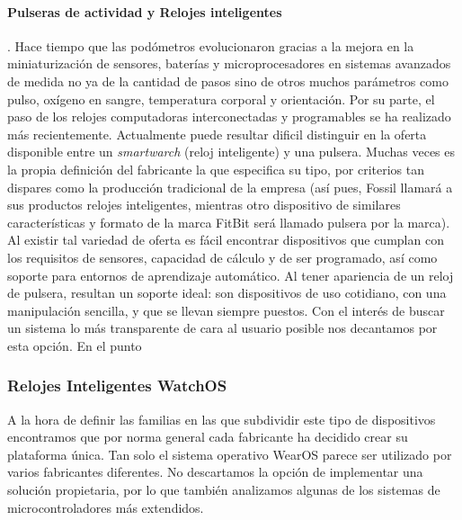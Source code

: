 \paragraph{Pulseras de actividad y Relojes inteligentes}. Hace tiempo que las podómetros evolucionaron gracias a la mejora en la miniaturización de sensores, baterías y microprocesadores en sistemas avanzados de medida no ya de la cantidad de pasos sino de otros muchos parámetros como pulso, oxígeno en sangre, temperatura corporal y orientación. Por su parte, el paso de los relojes computadoras interconectadas y programables se ha realizado más recientemente. Actualmente puede resultar dificil distinguir en la oferta disponible entre un \textit{smartwarch} (reloj inteligente) y una pulsera. Muchas veces es la propia definición del fabricante la que especifica su tipo, por criterios tan dispares como la producción tradicional de la empresa (así pues, Fossil llamará a sus productos relojes inteligentes, mientras otro dispositivo de similares características y formato de la marca FitBit será llamado pulsera por la marca). Al existir tal variedad de oferta es fácil encontrar dispositivos que cumplan con los requisitos de sensores, capacidad de cálculo y de ser programado, así como soporte para entornos de aprendizaje automático. Al tener apariencia de un reloj de pulsera, resultan un soporte ideal: son dispositivos de uso cotidiano, con una manipulación sencilla, y que se llevan siempre puestos. Con el interés de buscar un sistema lo más transparente de cara al usuario posible nos decantamos por esta opción. En el punto 

\subsubsection{Relojes Inteligentes WatchOS}

A la hora de definir las familias en las que subdividir este tipo de dispositivos encontramos que por norma general cada fabricante ha decidido crear su plataforma única. Tan solo el sistema operativo WearOS parece ser utilizado por varios fabricantes diferentes. No descartamos la opción de implementar una solución propietaria, por lo que también analizamos algunas de los sistemas de microcontroladores más extendidos.

